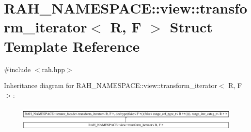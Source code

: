 \hypertarget{struct_r_a_h___n_a_m_e_s_p_a_c_e_1_1view_1_1transform__iterator}{}\section{R\+A\+H\+\_\+\+N\+A\+M\+E\+S\+P\+A\+CE\+::view\+::transform\+\_\+iterator$<$ R, F $>$ Struct Template Reference}
\label{struct_r_a_h___n_a_m_e_s_p_a_c_e_1_1view_1_1transform__iterator}


{\ttfamily \#include $<$rah.\+hpp$>$}

Inheritance diagram for R\+A\+H\+\_\+\+N\+A\+M\+E\+S\+P\+A\+CE\+::view\+::transform\+\_\+iterator$<$ R, F $>$\+:\begin{figure}[H]
\begin{center}
\leavevmode
\includegraphics[height=1.300813cm]{struct_r_a_h___n_a_m_e_s_p_a_c_e_1_1view_1_1transform__iterator}
\end{center}
\end{figure}
